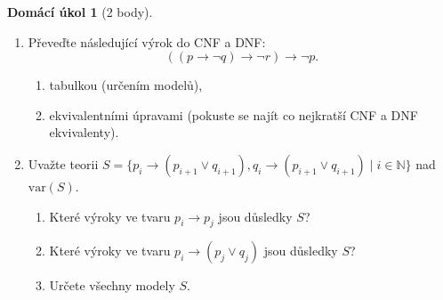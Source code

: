 \documentclass[a4paper]{article}
\theoremstyle{definition}
\newtheorem*{ukol}{Domácí úkol}
\begin{document}
\medskip\begin{ukol}[2 body]{\,}
\begin{enumerate}[label=\arabic*.]
    \item Převeďte následující výrok do CNF a DNF:
    $$
    ((p\to \neg q) \to \neg r) \to \neg p.
    $$
    \begin{enumerate}
        \item tabulkou (určením modelů),
        \item ekvivalentními úpravami (pokuste se najít co nejkratší CNF a DNF ekvivalenty).
    \end{enumerate}
    \item Uvažte  teorii $S=\{p_i \to (p_{i+1} \vee q_{i+1}), q_i \to (p_{i+1} \vee q_{i+1}) \mid i\in \mathbb{N}\}$ nad $\mathrm{var}(S)$.
    \begin{enumerate}
            \item Které výroky ve tvaru  $p_i \to p_j$ jsou důsledky $S$?
            \item Které výroky ve tvaru  $p_i \to (p_j \vee q_j)$ jsou důsledky $S$?
            \item Určete všechny modely $S$.
    \end{enumerate}
\end{enumerate} 
\end{ukol}
\end{document}
